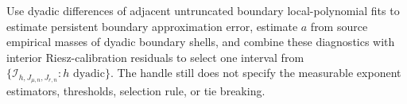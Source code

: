 Use dyadic differences of adjacent untruncated boundary local-polynomial fits to estimate persistent boundary approximation error, estimate \(a\) from source empirical masses of dyadic boundary shells, and combine these diagnostics with interior Riesz-calibration residuals to select one interval from \(\{\mathcal I_{h,J_{\mu,n},J_{r,n}}:h\text{ dyadic}\}\). The handle still does not specify the measurable exponent estimators, thresholds, selection rule, or tie breaking.